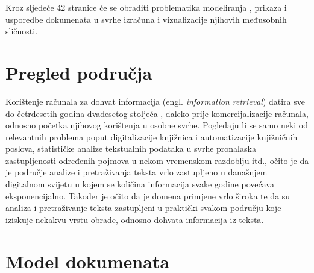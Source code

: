\documentclass[times, utf8, zavrsni, numeric]{fer}
\begin{document}
Kroz sljedeće 42 stranice će se obraditi problematika modeliranja \cite{hitchhiker}, prikaza i usporedbe dokumenata u svrhe izračuna i vizualizacije njihovih međusobnih sličnosti.

\chapter{Pregled područja}
\label{chap:overview}
Korištenje računala za dohvat informacija (engl. \textit{information retrieval}) datira sve do četrdesetih godina dvadesetog stoljeća \cite{sanderson2012history}, daleko prije komercijalizacije računala, odnosno početka njihovog korištenja u osobne svrhe. Pogledaju li se samo neki od relevantnih problema poput digitalizacije knjižnica i automatizacije knjižničnih poslova, statističke analize tekstualnih podataka u svrhe pronalaska zastupljenosti određenih pojmova u nekom vremenskom razdoblju itd., očito je da je područje analize i pretraživanja teksta vrlo zastupljeno u današnjem digitalnom svijetu u kojem se količina informacija svake godine povećava eksponencijalno. Također je očito da je domena primjene vrlo široka te da su analiza i pretraživanje teksta zastupljeni u praktički svakom području koje iziskuje nekakvu vrstu obrade, odnosno dohvata informacija iz teksta.

\chapter{Model dokumenata}
\label{docmodel}
\end{document}
